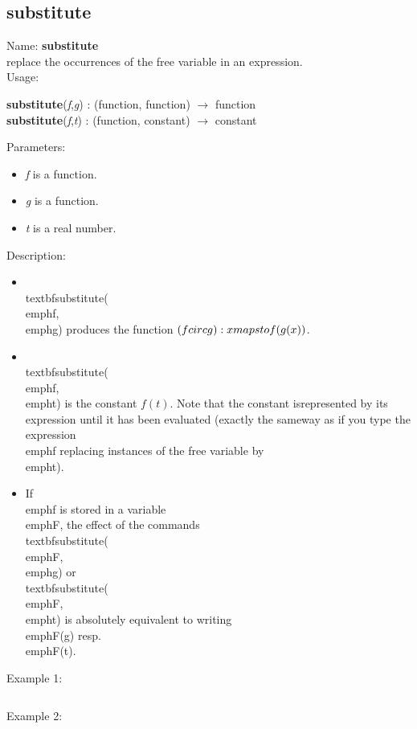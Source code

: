 \subsection{substitute}
\label{labsubstitute}
\noindent Name: \textbf{substitute}\\
replace the occurrences of the free variable in an expression.\\
\noindent Usage: 
\begin{center}
\textbf{substitute}(\emph{f},\emph{g}) : (\textsf{function}, \textsf{function}) $\rightarrow$ \textsf{function}\\
\textbf{substitute}(\emph{f},\emph{t}) : (\textsf{function}, \textsf{constant}) $\rightarrow$ \textsf{constant}\\
\end{center}
Parameters: 
\begin{itemize}
\item \emph{f} is a function.
\item \emph{g} is a function.
\item \emph{t} is a real number.
\end{itemize}
\noindent Description: \begin{itemize}

\item \\textbf{substitute}(\\emph{f}, \\emph{g}) produces the function $(f \\circ g) : x \\mapsto f(g(x))$.\n
\item \\textbf{substitute}(\\emph{f}, \\emph{t}) is the constant $f(t)$. Note that the constant is\n   represented by its expression until it has been evaluated (exactly the same\n   way as if you type the expression \\emph{f} replacing instances of the free variable \n   by \\emph{t}).\n
\item If \\emph{f} is stored in a variable \\emph{F}, the effect of the commands \\textbf{substitute}(\\emph{F},\\emph{g}) or \\textbf{substitute}(\\emph{F},\\emph{t}) is absolutely equivalent to \n   writing \\emph{F(g)} resp. \\emph{F(t)}.\n\end{itemize}
\noindent Example 1: 
\begin{center}\begin{minipage}{15cm}\begin{Verbatim}[frame=single]
\end{Verbatim}
\end{minipage}\end{center}
\noindent Example 2: 
\begin{center}\begin{minipage}{15cm}\begin{Verbatim}[frame=single]
\end{Verbatim}
\end{minipage}\end{center}
